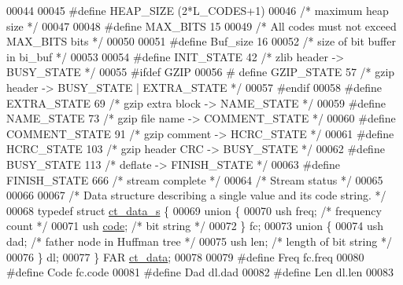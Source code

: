 \begin{DoxyCode}
00044 
00045 \textcolor{preprocessor}{#define HEAP\_SIZE (2*L\_CODES+1)}
00046 \textcolor{comment}{/* maximum heap size */}
00047 
00048 \textcolor{preprocessor}{#define MAX\_BITS 15}
00049 \textcolor{comment}{/* All codes must not exceed MAX\_BITS bits */}
00050 
00051 \textcolor{preprocessor}{#define Buf\_size 16}
00052 \textcolor{comment}{/* size of bit buffer in bi\_buf */}
00053 
00054 \textcolor{preprocessor}{#define INIT\_STATE    42    }\textcolor{comment}{/* zlib header -> BUSY\_STATE */}\textcolor{preprocessor}{}
00055 \textcolor{preprocessor}{#ifdef GZIP}
00056 \textcolor{preprocessor}{#  define GZIP\_STATE  57    }\textcolor{comment}{/* gzip header -> BUSY\_STATE | EXTRA\_STATE */}\textcolor{preprocessor}{}
00057 \textcolor{preprocessor}{#endif}
00058 \textcolor{preprocessor}{#define EXTRA\_STATE   69    }\textcolor{comment}{/* gzip extra block -> NAME\_STATE */}\textcolor{preprocessor}{}
00059 \textcolor{preprocessor}{#define NAME\_STATE    73    }\textcolor{comment}{/* gzip file name -> COMMENT\_STATE */}\textcolor{preprocessor}{}
00060 \textcolor{preprocessor}{#define COMMENT\_STATE 91    }\textcolor{comment}{/* gzip comment -> HCRC\_STATE */}\textcolor{preprocessor}{}
00061 \textcolor{preprocessor}{#define HCRC\_STATE   103    }\textcolor{comment}{/* gzip header CRC -> BUSY\_STATE */}\textcolor{preprocessor}{}
00062 \textcolor{preprocessor}{#define BUSY\_STATE   113    }\textcolor{comment}{/* deflate -> FINISH\_STATE */}\textcolor{preprocessor}{}
00063 \textcolor{preprocessor}{#define FINISH\_STATE 666    }\textcolor{comment}{/* stream complete */}\textcolor{preprocessor}{}
00064 \textcolor{comment}{/* Stream status */}
00065 
00066 
00067 \textcolor{comment}{/* Data structure describing a single value and its code string. */}
00068 \textcolor{keyword}{typedef} \textcolor{keyword}{struct }\hyperlink{structct__data__s}{ct\_data\_s} \{
00069     \textcolor{keyword}{union }\{
00070         ush  freq;       \textcolor{comment}{/* frequency count */}
00071         ush  \hyperlink{structcode}{code};       \textcolor{comment}{/* bit string */}
00072     \} fc;
00073     \textcolor{keyword}{union }\{
00074         ush  dad;        \textcolor{comment}{/* father node in Huffman tree */}
00075         ush  len;        \textcolor{comment}{/* length of bit string */}
00076     \} dl;
00077 \} FAR \hyperlink{structct__data__s}{ct\_data};
00078 
00079 \textcolor{preprocessor}{#define Freq fc.freq}
00080 \textcolor{preprocessor}{#define Code fc.code}
00081 \textcolor{preprocessor}{#define Dad  dl.dad}
00082 \textcolor{preprocessor}{#define Len  dl.len}
00083 

\end{DoxyCode}
